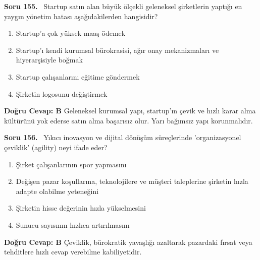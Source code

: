 \documentclass[11pt,a4paper,openany]{book}
\begin{document}
\needspace{5cm}
\vspace{8pt}
\noindent\textbf{\large\sffamily Soru 155.} \ Startup satın alan büyük ölçekli geleneksel şirketlerin yaptığı en yaygın yönetim hatası aşağıdakilerden hangisidir?
\begin{enumerate}[label=\Alph*), leftmargin=25pt, topsep=4pt, itemsep=2pt]
    \item Startup'a çok yüksek maaş ödemek
    \item Startup'ı kendi kurumsal bürokrasisi, ağır onay mekanizmaları ve hiyerarşisiyle boğmak
    \item Startup çalışanlarını eğitime göndermek
    \item Şirketin logosunu değiştirmek
\end{enumerate}
\vspace{4pt}
\begin{tcolorbox}[title=Cevap ve Açıklama, colback=gray!3!white, colframe=primarycolor!90!black, arc=2mm, fonttitle=\bfseries\sffamily, top=6pt, bottom=6pt]
    \textbf{Doğru Cevap: B}
    \vspace{2pt}
    Geleneksel kurumsal yapı, startup'ın çevik ve hızlı karar alma kültürünü yok ederse satın alma başarısız olur. Yarı bağımsız yapı korunmalıdır.
\end{tcolorbox}
\vspace{10pt}

\needspace{5cm}
\vspace{8pt}
\noindent\textbf{\large\sffamily Soru 156.} \ Yıkıcı inovasyon ve dijital dönüşüm süreçlerinde 'organizasyonel çeviklik' (agility) neyi ifade eder?
\begin{enumerate}[label=\Alph*), leftmargin=25pt, topsep=4pt, itemsep=2pt]
    \item Şirket çalışanlarının spor yapmasını
    \item Değişen pazar koşullarına, teknolojilere ve müşteri taleplerine şirketin hızla adapte olabilme yeteneğini
    \item Şirketin hisse değerinin hızla yükselmesini
    \item Sunucu sayısının hızlıca artırılmasını
\end{enumerate}
\vspace{4pt}
\begin{tcolorbox}[title=Cevap ve Açıklama, colback=gray!3!white, colframe=primarycolor!90!black, arc=2mm, fonttitle=\bfseries\sffamily, top=6pt, bottom=6pt]
    \textbf{Doğru Cevap: B}
    \vspace{2pt}
    Çeviklik, bürokratik yavaşlığı azaltarak pazardaki fırsat veya tehditlere hızlı cevap verebilme kabiliyetidir.
\end{tcolorbox}
\vspace{10pt}
\end{document}

